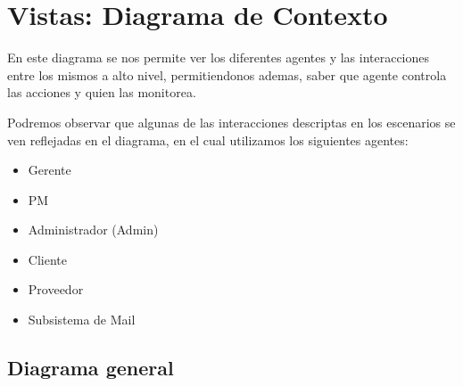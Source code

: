 \section{Vistas: Diagrama de Contexto}
En este diagrama se nos permite ver los diferentes agentes y las interacciones entre los mismos a alto nivel,
permitiendonos ademas, saber que agente controla las acciones y quien las monitorea.

Podremos observar que algunas de las interacciones descriptas en los escenarios se ven reflejadas en el diagrama, en el cual utilizamos los siguientes agentes:
\begin{itemize}
\item Gerente
\item PM 
\item Administrador (Admin) 
\item Cliente 
\item Proveedor
\item Subsistema de Mail 
\end{itemize}

\subsection{Diagrama general}

